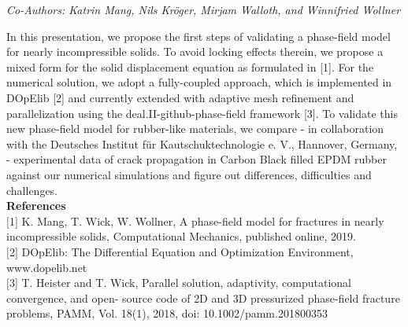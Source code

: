 \begin{center}
\textit{Co-Authors: Katrin Mang, Nils Kröger, Mirjam Walloth, and Winnifried Wollner}
\end{center} 
In this presentation, we propose the first steps of validating a phase-field model for nearly
incompressible solids. To avoid locking effects therein, we propose a mixed form for the solid
displacement equation as formulated in [1]. For the numerical solution, we adopt a fully-coupled
approach, which is implemented in DOpElib [2] and currently extended with adaptive mesh
refinement and parallelization using the deal.II-github-phase-field framework [3]. To validate
this new phase-field model for rubber-like materials, we compare - in collaboration with the
Deutsches Institut für Kautschuktechnologie e. V., Hannover, Germany, - experimental data of
crack propagation in Carbon Black filled EPDM rubber against our numerical simulations and
figure out differences, difficulties and challenges.\\

\noindent\textbf{References}\\
$[$1$]$ K. Mang, T. Wick, W. Wollner, A phase-field model for fractures in nearly incompressible
solids, Computational Mechanics, published online, 2019.\\\newline
$[$2$]$ DOpElib: The Differential Equation and Optimization Environment,\\ www.dopelib.net\\\newline
$[3$] T. Heister and T. Wick, Parallel solution, adaptivity, computational convergence, and open-
source code of 2D and 3D pressurized phase-field fracture problems, PAMM, Vol. 18(1),
2018, doi: 10.1002/pamm.201800353
